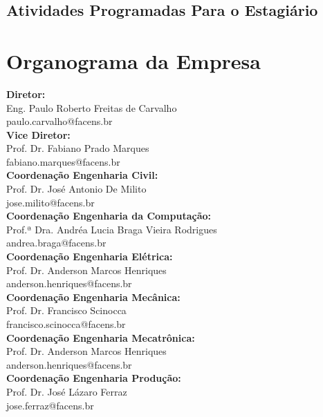 \documentclass[
	12pt,				%
	oneside,			%
	a4paper,			%
	chapter=TITLE,		%
	section=TITLE,		%
	sumario=tradicional %
	english,			%
	french,				%
	spanish,			%
	brazil				%
	]{abntex2}
\begin{document}
\section{Atividades Programadas Para o Estagiário}
\label{sec:ativestagiario}


\chapter{Organograma da Empresa}
\label{chap:chap3}
\textbf{Diretor:} \\ \indent Eng. Paulo Roberto Freitas de Carvalho \\
\indent paulo.carvalho@facens.br \\

\textbf{Vice Diretor:} \\ \indent  Prof. Dr. Fabiano Prado Marques \\
\indent fabiano.marques@facens.br \\

\textbf{Coordenação Engenharia Civil:}\\ \indent  Prof. Dr. José Antonio De Milito \\
\indent jose.milito@facens.br \\

\textbf{Coordenação Engenharia da Computação:}\\ \indent Prof.ª Dra. Andréa Lucia Braga Vieira Rodrigues \\
\indent andrea.braga@facens.br \\

\textbf{Coordenação Engenharia Elétrica:} \\ \indent Prof. Dr. Anderson Marcos Henriques \\
\indent anderson.henriques@facens.br \\

\textbf{Coordenação Engenharia Mecânica:} \\ \indent Prof. Dr. Francisco Scinocca \\
\indent francisco.scinocca@facens.br \\

\textbf{Coordenação Engenharia Mecatrônica:} \\ \indent Prof. Dr. Anderson Marcos Henriques \\
\indent anderson.henriques@facens.br \\

\textbf{Coordenação Engenharia Produção:} \\ \indent Prof. Dr. José Lázaro Ferraz \\
\indent jose.ferraz@facens.br \\
\end{document}
